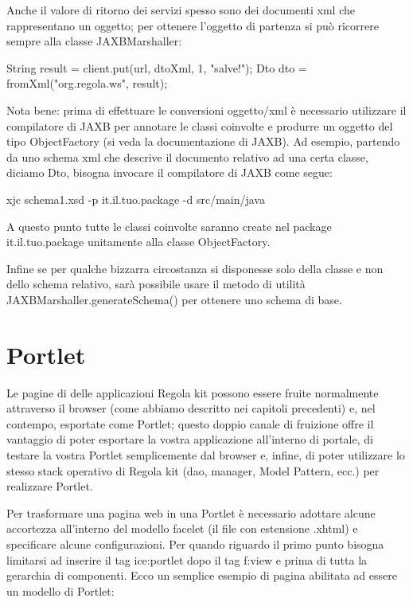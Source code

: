 Anche il valore di ritorno dei servizi spesso sono dei documenti xml che rappresentano un oggetto; per ottenere l'oggetto di partenza si può ricorrere sempre alla classe 
 JAXBMarshaller:

\begin{java}
 String result = client.put(url, dtoXml, 1, "salve!");
 Dto dto = fromXml("org.regola.ws", result);
 
\end{java} 

Nota bene: prima di effettuare le conversioni oggetto/xml è  necessario utilizzare il compilatore di JAXB per annotare le classi coinvolte e produrre un oggetto del tipo ObjectFactory (si veda la documentazione di JAXB). Ad esempio, partendo da uno schema xml che descrive il documento relativo ad una certa classe, diciamo Dto, bisogna invocare il compilatore di JAXB come segue:

\begin{bash}
 xjc schema1.xsd -p it.il.tuo.package -d src/main/java  
\end{bash}
 


A questo punto tutte le classi coinvolte saranno create nel package it.il.tuo.package unitamente alla classe ObjectFactory.

Infine se per qualche bizzarra circostanza si disponesse solo della classe e non dello schema relativo, sarà possibile usare il metodo di utilità JAXBMarshaller.generateSchema()  per ottenere uno schema di base.


\section{Portlet}
Le pagine di delle applicazioni Regola kit possono essere fruite normalmente attraverso il browser (come abbiamo descritto nei capitoli precedenti) e, nel contempo, esportate come Portlet; questo doppio canale di fruizione offre il vantaggio di poter esportare la vostra applicazione all'interno di portale, di testare la vostra Portlet semplicemente dal browser e, infine, di poter utilizzare lo stesso stack operativo di Regola kit  (dao, manager, Model Pattern, ecc.) per realizzare Portlet.

Per trasformare una pagina web in una Portlet è necessario adottare alcune accortezza all'interno del  modello facelet (il file con estensione .xhtml) e specificare alcune configurazioni. Per quando riguardo il primo punto bisogna limitarsi ad inserire il tag ice:portlet dopo il tag f:view e prima di tutta la gerarchia di componenti. Ecco un semplice esempio di pagina abilitata ad essere un modello di Portlet:

